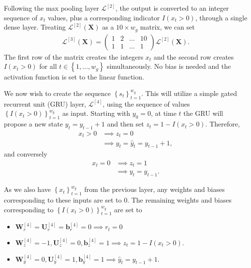 \documentclass{somasmsc}
\begin{document}
Following the max pooling layer $\mathcal{L}^{\left[2\right]}$, the output is converted to an integer sequence of $x_t$ values, plus a corresponding indicator $I(x_t > 0)$, through a single dense layer. Treating $\mathcal{L}^{\left[2\right]}\left(\mathbf{X}\right)$ as a $10 \times w_g$ matrix, we can set
\begin{align*}
\mathcal{L}^{\left[3\right]}\left(\mathbf{X}\right) =
\begin{pmatrix}
    1 & 2 & \dots & 10 \\
    1 & 1 & \dots & 1
\end{pmatrix}
\mathcal{L}^{\left[2\right]}\left(\mathbf{X}\right).
\end{align*}
The first row of the matrix creates the integers $x_t$ and the second row creates $I(x_t > 0)$ for all $t \in \left\{1, \dots, w_g\right\}$ simultaneously. No bias is needed and the activation function is set to the linear function.

We now wish to create the sequence $\left\{s_t\right\}_{t=1}^{w_g}$. This will utilize a simple gated recurrent unit (GRU) layer, $\mathcal{L}^{\left[4\right]}$, using the sequence of values $\left\{I(x_t > 0)\right\}_{t=1}^{w_g}$ as input. Starting with $y_0 = 0$, at time $t$ the GRU will propose a new state $\hat{y}_t = y_{t-1} + 1$ and then set $z_t = 1 - I(x_t > 0)$. Therefore,
\begin{align*}
x_t > 0 &\implies z_t = 0 \\
&\implies y_t = \hat{y}_t = y_{t-1} + 1,
\end{align*}
and conversely
\begin{align*}
x_t = 0 &\implies z_t = 1 \\
&\implies y_t = y_{t-1}.
\end{align*}

As we also have $\left\{x_t\right\}_{t=1}^{w_g}$ from the previous layer, any weights and biases corresponding to these inputs are set to 0. The remaining weights and biases corresponding to $\left\{I(x_t > 0)\right\}_{t=1}^{w_g}$ are set to
\begin{itemize}
    \item $\mathbf{W}^{\left[4\right]}_r = \mathbf{U}^{\left[4\right]}_r = \pmb{b}^{\left[4\right]}_r = 0 \implies r_t = 0$
    \item $\mathbf{W}^{\left[4\right]}_z = -1, \mathbf{U}^{\left[4\right]}_z = 0, \pmb{b}^{\left[4\right]}_z = 1 \implies z_t = 1 - I(x_t > 0)$.
    \item $\mathbf{W}^{\left[4\right]}_y = 0, \mathbf{U}^{\left[4\right]}_y = 1, \pmb{b}^{\left[4\right]}_y = 1 \implies \hat{y}_t = y_{t-1} + 1$.
\end{itemize}
\end{document}
